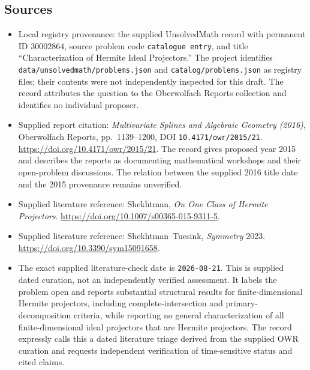 \documentclass[11pt]{article}
\begin{document}
\subsection{Sources}
\begin{itemize}
\item Local registry provenance: the supplied UnsolvedMath record with permanent ID \(30002864\), source problem code \texttt{catalogue entry}, and title ``Characterization of Hermite Ideal Projectors.'' The project identifies \texttt{data/unsolvedmath/problems.json} and \texttt{catalog/problems.json} as registry files; their contents were not independently inspected for this draft. The record attributes the question to the Oberwolfach Reports collection and identifies no individual proposer.
\item Supplied report citation: \emph{Multivariate Splines and Algebraic Geometry (2016)}, Oberwolfach Reports, pp.~1139--1200, DOI \texttt{10.4171/owr/2015/21}. \url{https://doi.org/10.4171/owr/2015/21}. The record gives proposed year 2015 and describes the reports as documenting mathematical workshops and their open-problem discussions. The relation between the supplied 2016 title date and the 2015 provenance remains unverified.
\item Supplied literature reference: Shekhtman, \emph{On One Class of Hermite Projectors}. \url{https://doi.org/10.1007/s00365-015-9311-5}.
\item Supplied literature reference: Shekhtman--Tuesink, \emph{Symmetry} 2023. \url{https://doi.org/10.3390/sym15091658}.
\item The exact supplied literature-check date is \texttt{2026-08-21}. This is supplied dated curation, not an independently verified assessment. It labels the problem open and reports substantial structural results for finite-dimensional Hermite projectors, including complete-intersection and primary-decomposition criteria, while reporting no general characterization of all finite-dimensional ideal projectors that are Hermite projectors. The record expressly calls this a dated literature triage derived from the supplied OWR curation and requests independent verification of time-sensitive status and cited claims.
\end{itemize}
\end{document}
